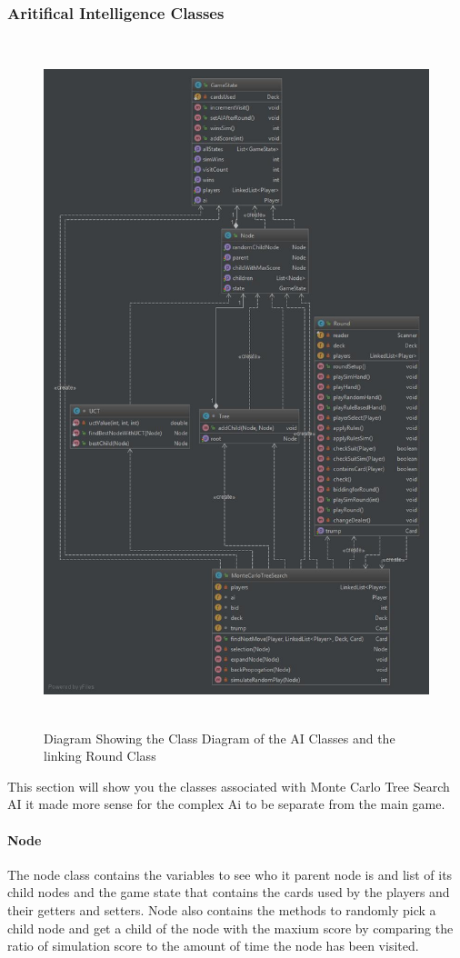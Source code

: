 \subsubsection{Aritifical Intelligence Classes}
\begin{figure}[h]
\centering
\includegraphics[width=15cm ,height=20cm,keepaspectratio]{AI_Classes}
\caption{Diagram Showing the Class Diagram of the AI Classes and the linking Round Class}
\label{fig:AI_Classes}
\end{figure}
This section will show you the classes associated with Monte Carlo Tree Search AI it made more sense for the complex Ai to be separate from the main game.
\paragraph{Node}
The node class contains the variables to see who it parent node is and list of its child nodes and the game state that contains the cards used by the players and their getters and setters. Node also contains the methods to randomly pick a child node and get a child of the node with the maxium score by comparing the ratio of simulation score to the amount of time the node has been visited.
